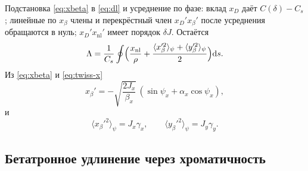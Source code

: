Подстановка \eqref{eq:xbeta} в \eqref{eq:dl} и усреднение по фазе: вклад $x_D$ даёт $C(\delta)-C_s$; линейные по $x_\beta$ члены и перекрёстный член $x_D'x_\beta'$ после усреднения обращаются в нуль; $x_D'x_{\mathrm{nl}}'$ имеет порядок $\delta J$. Остаётся
\begin{equation}
\label{eq:Lambda-slopes}
\Lambda
=\frac{1}{C_s}\oint\Bigl(
\frac{x_{\mathrm{nl}}}{\rho}
+\frac{\langle x_\beta'^2\rangle_\psi+\langle y_\beta'^2\rangle_\psi}{2}
\Bigr)\mathrm{d}s.
\end{equation}
Из \eqref{eq:xbeta} и \eqref{eq:twiss-x}
\begin{equation}
\label{eq:xp}
x_\beta'=-\sqrt{\frac{2J_x}{\beta_x}}\,(\sin\psi_x+\alpha_x\cos\psi_x),
\end{equation}
и
\begin{equation}
\label{eq:xp2}
\langle x_\beta'^2\rangle_\psi=J_x\gamma_x,
\qquad
\langle y_\beta'^2\rangle_\psi=J_y\gamma_y.
\end{equation}

\subsection{Бетатронное удлинение через хроматичность}

